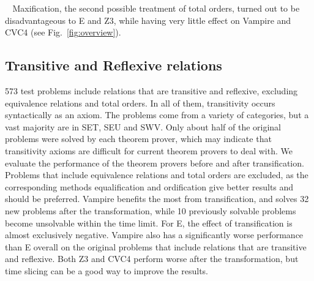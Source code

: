 \documentclass{article}
\renewcommand{\paragraph}[1]{\vspace{0.2cm}\noindent {\bf #1} $\;\;$}
\begin{document}
\paragraph{Maxification}
Maxification, the second possible treatment of total orders, turned out to be disadvantageous to E and Z3, while having very little effect on Vampire and CVC4 (see Fig.\ \ref{fig:overview}).



\subsection{Transitive and Reflexive relations}
573 test problems include relations that are transitive and reflexive, excluding equivalence relations and total orders. In all of them, transitivity occurs syntactically as an axiom. The problems come from a variety of categories, but a vast majority are in SET, SEU and SWV.  Only about half of the original problems were solved by each theorem prover, which may indicate that transitivity axioms are difficult for current theorem provers to deal with.  We evaluate the performance of the theorem provers before and after transification. Problems that include equivalence relations and total orders are excluded, as the corresponding methods equalification and ordification give better results and should be preferred. Vampire benefits the most from transification, and solves 32 new problems after the transformation, while 10 previously solvable problems become unsolvable within the time limit. For E, the effect of transification is almost exclusively negative.
Vampire also has a significantly worse performance than E overall on the original problems that include relations that are transitive and reflexive.
Both Z3 and CVC4 perform worse after the transformation, but time slicing can be a good way to improve the results. 
\end{document}
